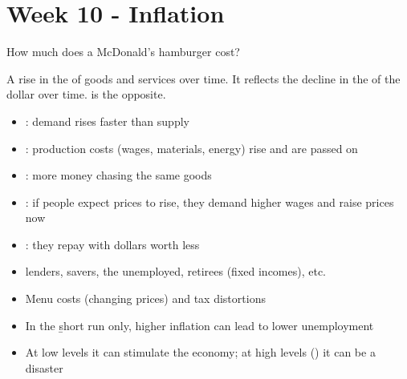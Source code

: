 
\section{Week 10 - Inflation}


\begin{example}
    How much does a McDonald's hamburger cost?
    \\
\end{example}

\begin{definition}[Inflation]
    A rise in the  of goods and services over time. It
    reflects the decline in the  of the dollar over
    time.  is the opposite.
\end{definition}

\begin{itemize}
    \item {}: demand rises faster than supply
    \item {}: production costs (wages, materials, energy) rise and are passed on
    \item {}: more money chasing the same goods
    \item {}: if people expect prices to rise, they demand higher wages and raise prices now
\end{itemize}

\begin{itemize}
    \item {}: they repay with dollars worth less
    \item {} lenders, savers, the unemployed, retirees (fixed incomes), etc.
    \item Menu costs (changing prices) and tax distortions
    \item In the \b{short run only}, higher inflation can lead to lower unemployment
    \item At low levels it can stimulate the economy; at high levels () it can be a disaster
\end{itemize}


